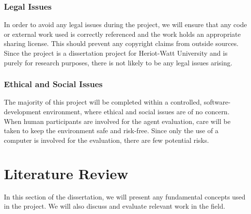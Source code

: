 \documentclass[12pt,a4paper]{article}
\begin{document}
\subsubsection{Legal Issues}
In order to avoid any legal issues during the project, we will ensure that any code or external work used is correctly referenced and the work holds an appropriate sharing license. This should prevent any copyright claims from outside sources. Since the project is a dissertation project for Heriot-Watt University and is purely for research purposes, there is not likely to be any legal issues arising.

\subsubsection{Ethical and Social Issues}
The majority of this project will be completed within a controlled, software-development environment, where ethical and social issues are of no concern. When human participants are involved for the agent evaluation, care will be taken to keep the environment safe and risk-free. Since only the use of a computer is involved for the evaluation, there are few potential risks.
\newpage
\section{Literature Review}
In this section of the dissertation, we will present any fundamental concepts used in the project. We will also discuss and evaluate relevant work in the field.
\end{document}
